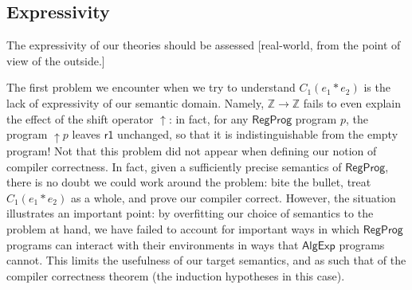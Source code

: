 \documentclass[sigplan,10pt,review,anonymous]{acmart}
\newcommand{\kw}[1]{\ensuremath{ \textsf{#1} }}
\begin{document}


\subsection{Expressivity} %

The expressivity of our theories
should be assessed
[real-world,
from the point of view of the outside.]

The first problem we encounter when we try to understand $C_1(e_1 * e_2)$
is the lack of expressivity of our semantic domain.
Namely,
$\mathbb{Z} \rightarrow \mathbb{Z}$
fails to even explain the effect of the shift operator $\uparrow$:
in fact, for any $\kw{RegProg}$ program $p$,
the program ${\uparrow}p$ leaves $\kw{r1}$ unchanged,
so that it is indistinguishable from the empty program!
Not that this problem did not appear
when defining our notion of compiler correctness.
In fact,
given a sufficiently precise semantics of $\kw{RegProg}$,
there is no doubt we could work around the problem:
bite the bullet, treat $C_1(e_1 * e_2)$ as a whole,
and prove our compiler correct.
However,
the situation illustrates an important point:
by overfitting our choice of semantics to the problem at hand,
we have failed to account for important ways in which
$\kw{RegProg}$ programs can interact with their environments
in ways that $\kw{AlgExp}$ programs cannot.
This limits the usefulness of our target semantics,
and as such that of the compiler correctness theorem
(the induction hypotheses in this case).
\end{document}
